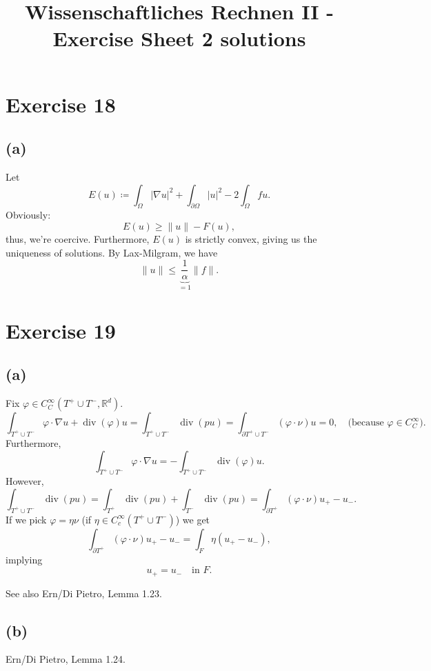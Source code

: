 \documentclass[oneside,a4paper]{amsart}
\DeclareMathOperator{\dive}{div}
\begin{document}
\title{Wissenschaftliches Rechnen II - Exercise Sheet 2 solutions}
\maketitle{}
\section*{Exercise 18}
\subsection*{(a)}
Let
\[
	E(u) \coloneqq \int_\Omega |\nabla u|^2 + \int_{\partial \Omega} |u|^2 - 2  \int_\Omega f u.
\]
Obviously:
\[
	E(u) \geq \| u \| - F(u),
\]
thus, we're coercive. Furthermore, $E(u)$ is strictly convex, giving us the uniqueness of solutions.
By Lax-Milgram, we have
\[
	\| u \| \leq \underbrace{ \frac{1}{\alpha} }_{= 1} \| f \|.
\]
\section*{Exercise 19}
\subsection*{(a)}
Fix $\varphi \in C_C^\infty(T^+ \cup T^-, \mathbb{R}^d)$.
\[
	\int_{T^+\cup T^-} \varphi \cdot \nabla u + \dive(\varphi) u = \int_{T^+ \cup T^-} \dive (pu) = \int_{\partial T^+ \cup T^-} (\varphi \cdot \nu) u = 0, \quad \text{(because $\varphi \in C_C^\infty$)}.
\]
Furthermore,
\[
\int_{T^+ \cup T^-} \varphi \cdot \nabla u = -\int_{T^+ \cup T^-} \dive(\varphi) u.
\]
However,
\[
\int_{T^+ \cup T^-} \dive (pu) = \int_{T^+} \dive (pu) + \int_{T^-} \dive (pu) = \int_{\partial T^+} (\varphi \cdot \nu) u_+ - u_-.
\]
If we pick $\varphi = \eta \nu$ (if $\eta \in C_c^\infty(T^+ \cup T^-)$) we get
\[
\int_{\partial T^+} (\varphi \cdot \nu) u_+ - u_- = \int_F \eta(u_+ - u_-),
\]
implying
\[
	u_+ = u_- \quad \text{in } F.
\]

See also Ern/Di Pietro, Lemma 1.23.
\subsection*{(b)}
Ern/Di Pietro, Lemma 1.24.
\end{document}

